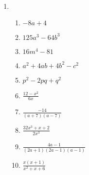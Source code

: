 {\begin{multicols}{3}
\begin{enumerate}[noitemsep, label=\textbf{\arabic*}. ]
\begin{enumerate}[noitemsep, label=\textbf{(\alph*)} ] 
\item $(a - 3)(a + 3)$%
\item $(m + 6)(m - 6)$%
\item $(3b - 9)(3b + 9)$%
\item $(4b + 5a)(4b - 5a)$%
\item $(m +\frac{1}{3})(m -\frac{1}{3})$%
\item $5(1 - ab^3)(1 + ab^3)$%
\item $b(4a^2 - 9)(2a + 3)(2a - 3)$%
\item $(a - 5)(a - 5)$%
\item $(4b + 7)(4b + 7)$%
\item $(2a - 6b)(a - 3b)$%
\item $-4b^2(6b^3 - 1)(6b^3 - 1)$%
\item $(2 - x)(2 + x)(4 + x^2)$%
\item $7(x - 2)(x + y)$%
\item $(y - 10)(y + 3)$%
\item $(1 - x)^{2}(1 +x)$%
\item $(p - 1)(-3p-2)$%
\item $(x+y)(1-x^2+xy-y^2)$
\item $x(x-2)+(1+y)(1-y)(1+y^2)$
\item $(x-1)(x^2+x+1)(4b-x)$
\item $3(p-\frac{1}{3})(p^2+\frac{p}{3}+\frac{1}{9})$
\item $(2x^2-5y^3)(4x^4+10x^2y^3+25y^6)$
\item $(-p)(12+18p+7p^2)$
\end{enumerate}


\item %

\begin{enumerate}[noitemsep, label=\textbf{(\alph*)} ] 

\item$-8a + 4$%
\item $125a^3 - 64b^3$ %
\item $16m^4 - 81$%
\item $a^2 + 4ab + 4b^2 - c^2$%
\item $p^2 - 2pq +q^2$%
\item $\frac{12 - x^2}{6x}$%
\item $\frac{-14}{(a+7)(a-7)}$
\item $\frac{32x^3+x+2}{2x^3}$
\item $\frac{4a-1}{(2a+1)(2a-1)(a-1)}$
\item $\frac{x(x+1)}{x^2+x+6}$
\end{enumerate}



\end{enumerate}
\end{multicols}}
